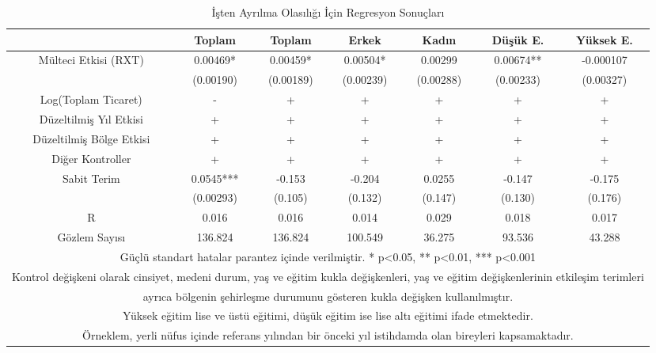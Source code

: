 \documentclass{article}
\begin{document}
\begin{justify}
        \FloatBarrier
        \begin{table}[h]
            \centering
            \caption{İşten Ayrılma Olasılığı İçin Regresyon Sonuçları}
            \begin{tabular}{|ccccccc|}
                \hline
                     & Toplam & Toplam & Erkek & Kadın & Düşük E. & Yüksek E. \\ \hline
                     Mülteci Etkisi (RXT) & 0.00469* & 0.00459* & 0.00504* & 0.00299 & 0.00674** & -0.000107 \\ 
                     & (0.00190) & (0.00189) & (0.00239) & (0.00288) & (0.00233) & (0.00327) \\ 
                    Log(Toplam Ticaret) & - & + & + & + & + & + \\ 
                    Düzeltilmiş Yıl Etkisi & + & + & + & + & + & + \\ 
                    Düzeltilmiş Bölge Etkisi & + & + & + & + & + & + \\ 
                    Diğer Kontroller & + & + & + & + & + & + \\
                    Sabit Terim & 0.0545*** & -0.153 & -0.204 & 0.0255 & -0.147 & -0.175 \\ 
                    & (0.00293) & (0.105) & (0.132) & (0.147) & (0.130) & (0.176) \\ 
                    R & 0.016 & 0.016 & 0.014 & 0.029 & 0.018 & 0.017 \\ 
                    Gözlem Sayısı & 136.824 & 136.824 & 100.549 & 36.275 & 93.536 & 43.288 \\ \hline
                    \multicolumn{7}{|c|}{\scriptsize Güçlü standart hatalar parantez içinde verilmiştir.   * p<0.05, ** p<0.01, *** p<0.001}\\ \hline
                    \multicolumn{7}{|c|}{\scriptsize Kontrol değişkeni olarak cinsiyet, medeni durum, yaş ve eğitim kukla değişkenleri, yaş ve eğitim değişkenlerinin etkileşim terimleri} \\ 
                    \multicolumn{7}{|c|}{\scriptsize ayrıca bölgenin şehirleşme durumunu gösteren kukla değişken kullanılmıştır.} \\ \hline
                    \multicolumn{7}{|c|}{\scriptsize Yüksek eğitim lise ve üstü eğitimi, düşük eğitim ise lise altı eğitimi ifade etmektedir.} \\ \hline
                    \multicolumn{7}{|c|}{\scriptsize Örneklem, yerli nüfus içinde referans yılından bir önceki yıl istihdamda olan bireyleri kapsamaktadır.} \\ \hline


\end{tabular}
\end{table}
\end{justify}
\end{document}

